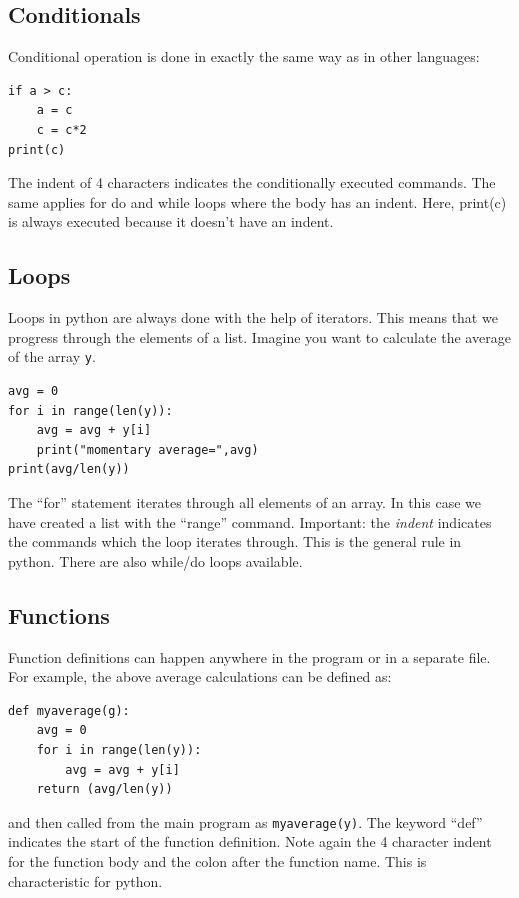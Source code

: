 \documentclass[12pt,a4paper]{article}
\begin{document}
\subsection{Conditionals}
Conditional operation is done in exactly the same way as in other languages:
\begin{verbatim}
if a > c:
    a = c
    c = c*2
print(c)
\end{verbatim}
The indent of 4 characters indicates the conditionally executed commands. The same
applies for do and while loops where the body has an indent. Here, print(c)
is always executed because it doesn't have an indent.

\subsection{Loops}
Loops in python are always done with the help of iterators. This
means that we progress through the elements of a list.
Imagine you want to calculate the average of the array \texttt{y}.
\begin{verbatim}
avg = 0
for i in range(len(y)):
    avg = avg + y[i]
    print("momentary average=",avg)
print(avg/len(y))
\end{verbatim}
The ``for'' statement iterates through all elements of an array. In this
case we have created a list with the ``range'' command. Important: the \textsl{indent}
indicates the commands which the loop iterates through. This is the general rule in python.
There are also while/do loops available.


\subsection{Functions}
Function definitions can happen anywhere in the program or in a separate file.
For example, the above average calculations can be defined as:

\begin{verbatim}
def myaverage(g):
    avg = 0
    for i in range(len(y)):
        avg = avg + y[i]
    return (avg/len(y))
\end{verbatim}
and then called from the main program as \texttt{myaverage(y)}.
The keyword ``def'' indicates the start of the function definition.
Note again the 4 character indent
for the function body and the colon after the function name. This is characteristic
for python.
\end{document}
